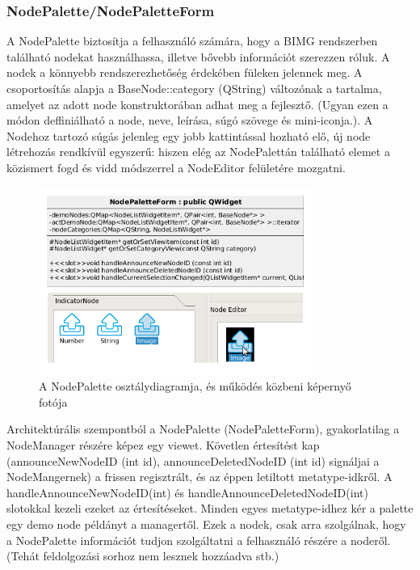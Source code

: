 \documentclass[a4paper,12pt,oneside]{report}
\begin{document}
\subsubsection{NodePalette/NodePaletteForm}
A NodePalette biztosítja a felhasználó számára, hogy a BIMG rendszerben található nodekat használhassa, illetve bővebb információt szerezzen róluk. A nodek a könnyebb rendszerezhetőség érdekében füleken jelennek meg. A csoportosítás alapja a BaseNode::category (QString) változónak a tartalma, amelyet az adott node konstruktorában adhat meg a fejlesztő. (Ugyan ezen a módon deffiniálható a node, neve, leírása, súgó szövege és mini-iconja.). A Nodehoz tartozó súgás jelenleg egy jobb kattintással hozható elő, új node létrehozás rendkívül egyszerű: hiszen elég az NodePalettán található elemet a közismert fogd és vidd módszerrel a NodeEditor felületére mozgatni.
\begin{center}
\begin{figure}[h]
  \includegraphics[width=0.8\textwidth]{nodepalette.png}
  \caption{A NodePalette osztálydiagramja, és működés közbeni képernyő fotója }

  \label{fig:bimg_nodepalette}
\end{figure}
\end{center}

Architektúrális szempontból a NodePalette (NodePaletteForm), gyakorlatilag a NodeManager részére képez egy viewet. Követlen értesítést kap (announceNewNodeID (int id), announceDeletedNodeID (int id) signáljai a NodeMangernek) a frissen regisztrált, és az éppen letiltott metatype-idkről. A handleAnnounceNewNodeID(int) és handleAnnounceDeletedNodeID(int) slotokkal kezeli ezeket az értesítéseket. Minden egyes metatype-idhez kér a palette egy demo node példányt a managertől. Ezek a nodek, csak arra szolgálnak, hogy a NodePalette információt tudjon szolgáltatni a felhasználó részére a noderől. (Tehát feldolgozási sorhoz nem lesznek hozzáadva stb.)
\end{document}
